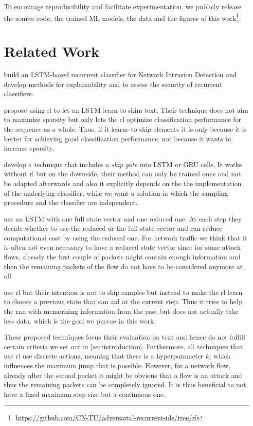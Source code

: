 \documentclass[conference]{IEEEtran}
\begin{document}
To encourage reproducibility and facilitate experimentation, we publicly release the source code, the trained ML models, the data and the figures of this work\footnote{\url{https://github.com/CN-TU/adversarial-recurrent-ids/tree/rl}}.

\section{Related Work}

\cite{hartl_explainability_2019} build an LSTM-based \cite{hochreiter_long_1997} recurrent classifier for Network Intrusion Detection and develop methods for explainability and to assess the security of recurrent classifiers.

\cite{yu_learning_2017} propose using \gls{rl} to let an LSTM learn to skim text. Their technique does not aim to maximize sparsity but only lets the \gls{rl} optimize classification performance for the sequence as a whole. Thus, if it learns to skip elements it is only because it is better for achieving good classification performance, not because it wants to increase sparsity.

\cite{campos_skip_2018} develop a technique that includes a \textit{skip gate} into LSTM or GRU \cite{cho_learning_2014} cells. It works without \gls{rl} but on the downside, their method can only be trained once and not be adapted afterwards and also it explicitly depends on the the implementation of the underlying classifier, while we want a solution in which the sampling procedure and the classifier are independent.

\cite{seo_neural_2018} use an LSTM with one full state vector and one reduced one. At each step they decide whether to use the reduced or the full state vector and can reduce computational cost by using the reduced one. For network traffic we think that it is often not even necessary to have a reduced state vector since for some attack flows, already the first couple of packets might contain enough information and then the remaining packets of the flow do not have to be considered anymore at all.

\cite{gui_long_2018} use \gls{rl} but their intention is not to skip samples but instead to make the \gls{rl} learn to choose a previous state that can aid at the current step. Thus it tries to help the \gls{rnn} with memorizing information from the past but does not actually take less data, which is the goal we pursue in this work.

These proposed techniques focus their evaluation on text and hence do not fulfill certain criteria we set out in \autoref{sec:introduction}. Furthermore, all techniques that use \gls{rl} use discrete actions, meaning that there is a hyperparameter $k$, which influences the maximum jump that is possible. However, for a network flow, already after the second packet it might be obvious that a flow is an attack and thus the remaining packets can be completely ignored. It is thus beneficial to not have a fixed maximum step size but a continuous one.
\end{document}
